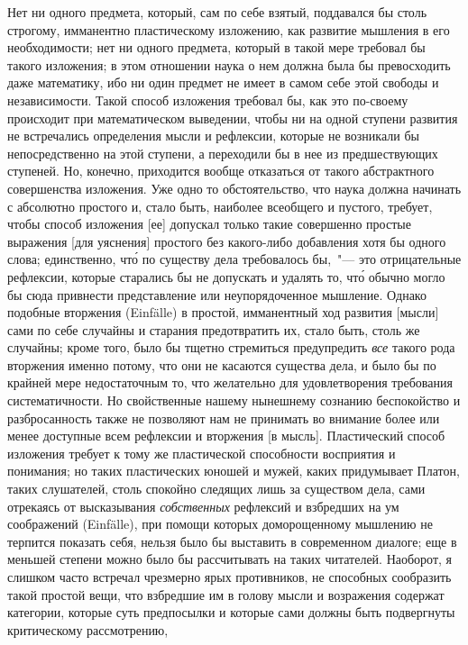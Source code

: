 Нет ни одного предмета, который, сам по себе взятый,
поддавался бы столь строгому, имманентно пластическому
изложению, как развитие мышления в его необходимости;
нет ни одного предмета, который в такой мере требовал
бы такого изложения; в этом отношении наука о нем
должна была бы превосходить даже математику, ибо ни
один предмет не имеет в самом себе этой свободы и независимости.
Такой способ изложения требовал бы, как это
по-своему происходит при математическом выведении,
чтобы ни на одной ступени развития не встречались определения
мысли и рефлексии, которые не возникали бы
непосредственно на этой ступени, а переходили бы в нее
из предшествующих ступеней. Но, конечно, приходится
вообще отказаться от такого абстрактного совершенства
изложения. Уже одно то обстоятельство, что наука должна
начинать с абсолютно простого и, стало быть, наиболее
всеобщего и пустого, требует, чтобы способ изложения [ее]
допускал только такие совершенно простые выражения
[для уяснения] простого без какого-либо добавления хотя
бы одного слова; единственно, чт\'о по существу дела требовалось
бы,~"--- это отрицательные рефлексии, которые старались
бы не допускать и удалять то, чт\'о обычно могло
бы сюда привнести представление или неупорядоченное
мышление. Однако подобные вторжения (Einfälle) в простой,
имманентный ход развития [мысли] сами по себе
случайны и старания предотвратить их, стало быть, столь
же случайны; кроме того, было бы тщетно стремиться
предупредить \emph{все} такого рода вторжения именно потому,
что они не касаются существа дела, и было бы по крайней
мере недостаточным то, что желательно для удовлетворения
требования систематичности. Но свойственные
нашему нынешнему сознанию беспокойство и разбросанность
также не позволяют нам не принимать во внимание
более или менее доступные всем рефлексии и вторжения
[в мысль]. Пластический способ изложения требует к тому
же пластической способности восприятия и понимания\endnotemark{};
но таких пластических юношей и мужей, каких
придумывает Платон, таких слушателей, столь спокойно
следящих лишь за существом дела, сами отрекаясь от
высказывания \emph{собственных} рефлексий и взбредших на ум
соображений (Einfälle), при помощи которых доморощенному
мышлению не терпится показать себя, нельзя
было бы выставить в современном диалоге; еще в меньшей
степени можно было бы рассчитывать на таких читателей.
Наоборот, я слишком часто встречал чрезмерно
ярых противников, не способных сообразить такой простой
вещи, что взбредшие им в голову мысли и возражения
содержат категории, которые суть предпосылки и которые
сами должны быть подвергнуты критическому рассмотрению,
